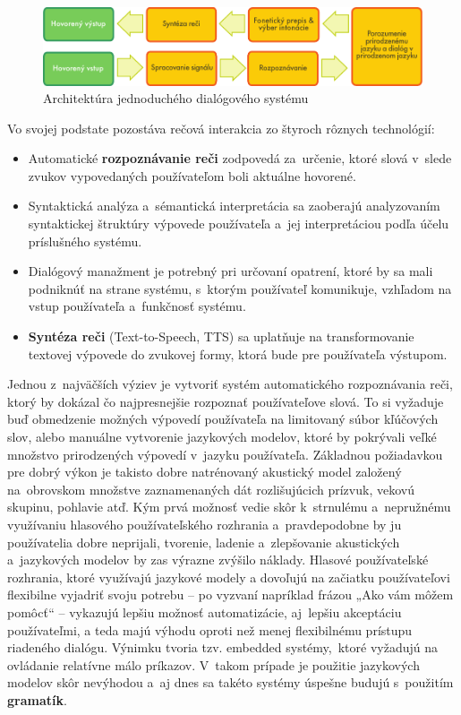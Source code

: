 \begin{multicols}{2}
\begin{figure}[htb]
  \center
  \includegraphics[width=\textwidth]{../_media/slovak/simple_speech-based_dialogue_architecture}
  \caption{Architektúra jednoduchého dialógového systému}
  \label{fig:dialoguearch_sk}
\end{figure}

Vo svojej podstate pozostáva rečová interakcia zo štyroch rôznych technológií:

\begin{itemize}
\item Automatické \textbf{rozpoznávanie reči} zodpovedá za~určenie, ktoré slová v~slede zvukov vypovedaných používateľom boli aktuálne hovorené.
\item Syntaktická analýza a~sémantická interpretácia sa zaoberajú analyzovaním syntaktickej štruktúry výpovede používateľa a~jej interpretáciou podľa účelu príslušného systému.
\item Dialógový manažment je potrebný pri určovaní opatrení, ktoré by sa mali podniknúť na strane systému, s~ktorým používateľ komunikuje, vzhľadom na vstup používateľa a~funkčnosť systému.
\item \textbf{Syntéza reči} (Text-to-Speech, TTS) sa uplatňuje na transformovanie textovej výpovede do zvukovej formy, ktorá bude pre používateľa výstupom.
\end{itemize}

Jednou z~najväčších výziev je vytvoriť systém automatického
rozpoznávania reči, ktorý by dokázal čo najpresnejšie rozpoznať
používateľove slová. To si vyžaduje buď obmedzenie možných
výpovedí používateľa na limitovaný súbor kľúčových slov,
alebo manuálne vytvorenie jazykových modelov, ktoré by pokrývali
veľké množstvo prirodzených výpovedí v~jazyku používateľa.
Základnou požiadavkou pre dobrý výkon je takisto dobre natrénovaný
akustický model založený na~obrovskom množstve zaznamenaných dát
rozlišujúcich prízvuk, vekovú skupinu, pohlavie atď. Kým prvá
možnosť vedie skôr k~strnulému a~nepružnému využívaniu
hlasového používateľského rozhrania a~pravdepodobne by ju
používatelia dobre neprijali, tvorenie, ladenie a~zlepšovanie
akustických a~jazykových modelov by zas výrazne zvýšilo náklady.
Hlasové používateľské rozhrania, ktoré využívajú jazykové
modely a dovoľujú na začiatku používateľovi flexibilne vyjadriť
svoju potrebu -- po vyzvaní napríklad frázou „Ako vám môžem
pomôcť“ -- vykazujú lepšiu možnosť automatizácie,
aj~lepšiu akceptáciu používateľmi, a teda majú výhodu oproti
než menej flexibilnému prístupu riadeného dialógu. Výnimku tvoria
tzv. embedded systémy,~ktoré vyžadujú na ovládanie relatívne málo
príkazov. V~takom prípade je použitie jazykových modelov
skôr nevýhodou a~aj dnes sa takéto systémy úspešne budujú
s~použitím \textbf{gramatík}.


\end{multicols}
